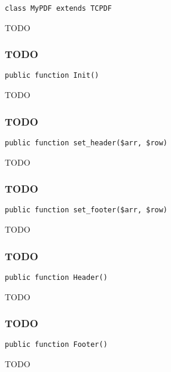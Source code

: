 \documentclass[a4paper]{article}
\begin{document}
\begin{lstlisting}
class MyPDF extends TCPDF
\end{lstlisting}

TODO

\hypertarget{toc503}{}
\subsubsection{TODO}

\begin{lstlisting}
public function Init()
\end{lstlisting}

TODO

\hypertarget{toc504}{}
\subsubsection{TODO}

\begin{lstlisting}
public function set_header($arr, $row)
\end{lstlisting}

TODO

\hypertarget{toc505}{}
\subsubsection{TODO}

\begin{lstlisting}
public function set_footer($arr, $row)
\end{lstlisting}

TODO

\hypertarget{toc506}{}
\subsubsection{TODO}

\begin{lstlisting}
public function Header()
\end{lstlisting}

TODO

\hypertarget{toc507}{}
\subsubsection{TODO}

\begin{lstlisting}
public function Footer()
\end{lstlisting}

TODO
\end{document}
